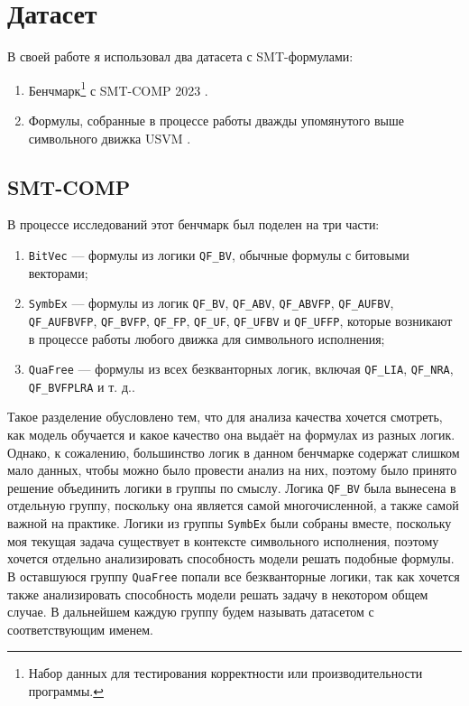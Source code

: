 \section{Датасет} \label{datasets}

В своей работе я использовал два датасета с SMT-формулами:

\begin{enumerate}
    \item Бенчмарк\footnote{Набор данных для тестирования корректности или производительности программы.} с SMT-COMP 2023 \cite{smt-comp-2023-benchmarks}.
    \item Формулы, собранные в процессе работы дважды упомянутого выше символьного движка USVM \cite{usvm-diploma}.
\end{enumerate}

\subsection{SMT-COMP}

В процессе исследований этот бенчмарк был поделен на три части:

\begin{enumerate}
    \item \texttt{BitVec} --- формулы из логики \texttt{QF\_BV}, обычные формулы с битовыми векторами;
    \item \texttt{SymbEx} --- формулы из логик \texttt{QF\_BV}, \texttt{QF\_ABV}, \texttt{QF\_ABVFP}, \texttt{QF\_AUFBV}, \\ \texttt{QF\_AUFBVFP}, \texttt{QF\_BVFP}, \texttt{QF\_FP}, \texttt{QF\_UF}, \texttt{QF\_UFBV} и \texttt{QF\_UFFP}, которые возникают в процессе работы любого движка для символьного исполнения;
    \item \texttt{QuaFree} --- формулы из всех безкванторных логик, включая \texttt{QF\_LIA}, \texttt{QF\_NRA}, \texttt{QF\_BVFPLRA} и т. д..
\end{enumerate}

Такое разделение обусловлено тем, что для анализа качества хочется смотреть, как модель обучается и какое качество она выдаёт на формулах из разных логик. Однако, к сожалению, большинство логик в данном бенчмарке содержат слишком мало данных, чтобы можно было провести анализ на них, поэтому было принято решение объединить логики в группы по смыслу. Логика \texttt{QF\_BV} была вынесена в отдельную группу, поскольку она является самой многочисленной, а также самой важной на практике. Логики из группы \texttt{SymbEx} были собраны вместе, поскольку моя текущая задача существует в контексте символьного исполнения, поэтому хочется отдельно анализировать способность модели решать подобные формулы. В оставшуюся группу \texttt{QuaFree} попали все безкванторные логики, так как хочется также анализировать способность модели решать задачу в некотором общем случае. В дальнейшем каждую группу будем называть датасетом с соответствующим именем.

